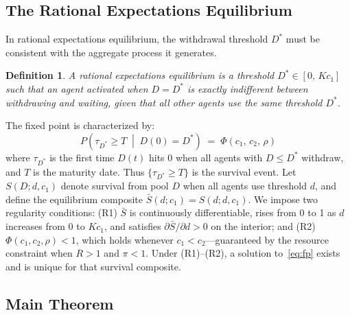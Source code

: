 \documentclass[12pt]{article}\usepackage[]{graphicx}\usepackage[]{xcolor}
\newtheorem{definition}{Definition}
\begin{document}
\subsection{The Rational Expectations Equilibrium}

In rational expectations equilibrium, the withdrawal threshold $D^*$ must be consistent with the aggregate process it generates.

\begin{definition}
A rational expectations equilibrium is a threshold $D^* \in [0,\, K c_1]$ such that an agent activated when $D = D^*$ is exactly indifferent between withdrawing and waiting, given that all other agents use the same threshold $D^*$.
\end{definition}

The fixed point is characterized by:
%
\begin{equation}
  P\!\left(\tau_{D^*} \geq T \;\middle|\; D(0) = D^*\right)
  \;=\; \Phi(c_1,\,c_2,\,\rho)
  \label{eq:fp}
\end{equation}
%
where $\tau_{D^*}$ is the first time $D(t)$ hits $0$ when all agents with $D \leq D^*$ withdraw, and $T$ is the maturity date.
Thus $\{\tau_{D^*}\geq T\}$ is the survival event.
Let $S(D;d,c_1)$ denote survival from pool $D$ when all agents use threshold $d$, and define the equilibrium composite $\bar S(d;c_1)=S(d;d,c_1)$.
We impose two regularity conditions: (R1) $\bar S$ is continuously differentiable, rises from 0 to 1 as $d$ increases from 0 to $Kc_1$, and satisfies $\partial\bar S/\partial d>0$ on the interior; and (R2) $\Phi(c_1,c_2,\rho) < 1$, which holds whenever $c_1 < c_2$---guaranteed by the resource constraint when $R > 1$ and $\pi < 1$.
Under (R1)--(R2), a solution to~\eqref{eq:fp} exists and is unique for that survival composite.

\subsection{Main Theorem}
\end{document}
